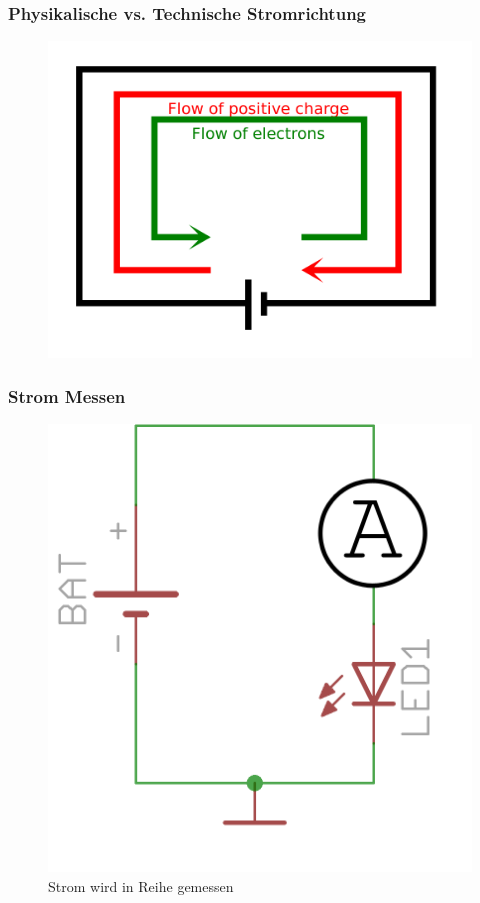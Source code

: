 \begin{frame}
    \frametitle{Physikalische vs. Technische Stromrichtung}
  		\begin{center}
   		 \begin{figure}
      			\includegraphics[width=.7\textwidth,height=.75\textheight,keepaspectratio]{e02/Current_notation.png}
 			\end{figure}
       		\end{center}
\end{frame}

\begin{frame}
    \frametitle{Strom Messen}
    \begin{center}
    \begin{figure}
      \includegraphics[width=.5\textwidth,height=.75\textheight,keepaspectratio]{e02/reiheAmpare.png}
      \caption{Strom wird in Reihe gemessen}
    \end{figure}
  \end{center}
\end{frame}


